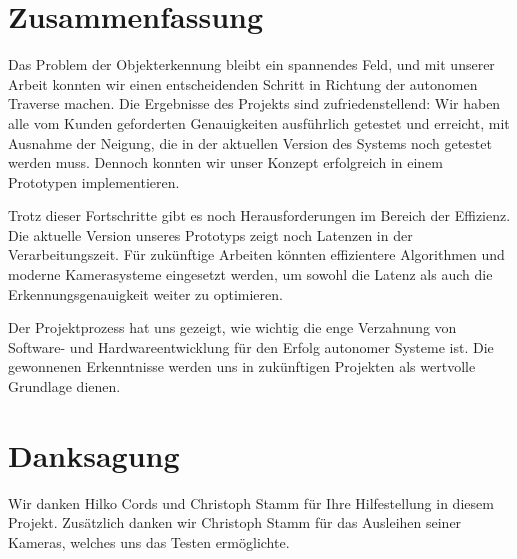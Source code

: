 \section{Zusammenfassung}
Das Problem der Objekterkennung bleibt ein spannendes Feld, und mit unserer Arbeit konnten wir einen entscheidenden
Schritt in Richtung der autonomen Traverse machen. Die Ergebnisse des Projekts sind zufriedenstellend: Wir haben alle vom
Kunden geforderten Genauigkeiten ausführlich getestet und erreicht, mit Ausnahme der Neigung, die in der aktuellen Version
des Systems noch getestet werden muss. Dennoch konnten wir unser Konzept erfolgreich in einem Prototypen implementieren.

Trotz dieser Fortschritte gibt es noch Herausforderungen im Bereich der Effizienz. Die aktuelle Version unseres Prototyps
zeigt noch Latenzen in der Verarbeitungszeit. Für zukünftige Arbeiten könnten effizientere Algorithmen und moderne Kamerasysteme
eingesetzt werden, um sowohl die Latenz als auch die Erkennungsgenauigkeit weiter zu optimieren. 

Der Projektprozess hat uns gezeigt, wie wichtig die enge Verzahnung von Software- und Hardwareentwicklung für den Erfolg autonomer
Systeme ist. Die gewonnenen Erkenntnisse werden uns in zukünftigen Projekten als wertvolle Grundlage dienen.

\section{Danksagung}

Wir danken Hilko Cords und Christoph Stamm für Ihre Hilfestellung in diesem Projekt. Zusätzlich danken wir Christoph Stamm für das Ausleihen seiner Kameras, welches uns das Testen ermöglichte.